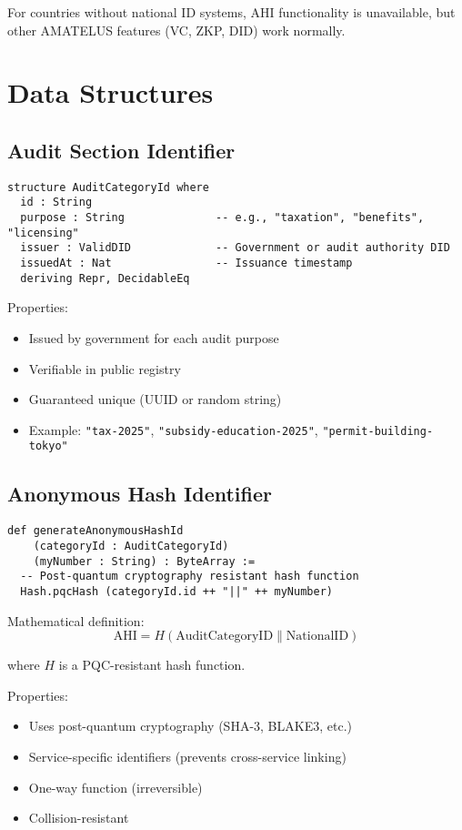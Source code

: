 For countries without national ID systems, AHI functionality is unavailable, but other AMATELUS features
(VC, ZKP, DID) work normally.

\section{Data Structures}

\subsection{Audit Section Identifier}

\begin{lstlisting}[language=Lean]
structure AuditCategoryId where
  id : String
  purpose : String              -- e.g., "taxation", "benefits", "licensing"
  issuer : ValidDID             -- Government or audit authority DID
  issuedAt : Nat                -- Issuance timestamp
  deriving Repr, DecidableEq
\end{lstlisting}

Properties:
\begin{itemize}
  \item Issued by government for each audit purpose
  \item Verifiable in public registry
  \item Guaranteed unique (UUID or random string)
  \item Example: \texttt{"tax-2025"}, \texttt{"subsidy-education-2025"}, \texttt{"permit-building-tokyo"}
\end{itemize}

\subsection{Anonymous Hash Identifier}

\begin{lstlisting}[language=Lean]
def generateAnonymousHashId
    (categoryId : AuditCategoryId)
    (myNumber : String) : ByteArray :=
  -- Post-quantum cryptography resistant hash function
  Hash.pqcHash (categoryId.id ++ "||" ++ myNumber)
\end{lstlisting}

Mathematical definition:
\[
\text{AHI} = H(\text{AuditCategoryID} \parallel \text{NationalID})
\]

where $H$ is a PQC-resistant hash function.

Properties:
\begin{itemize}
  \item Uses post-quantum cryptography (SHA-3, BLAKE3, etc.)
  \item Service-specific identifiers (prevents cross-service linking)
  \item One-way function (irreversible)
  \item Collision-resistant
\end{itemize}


